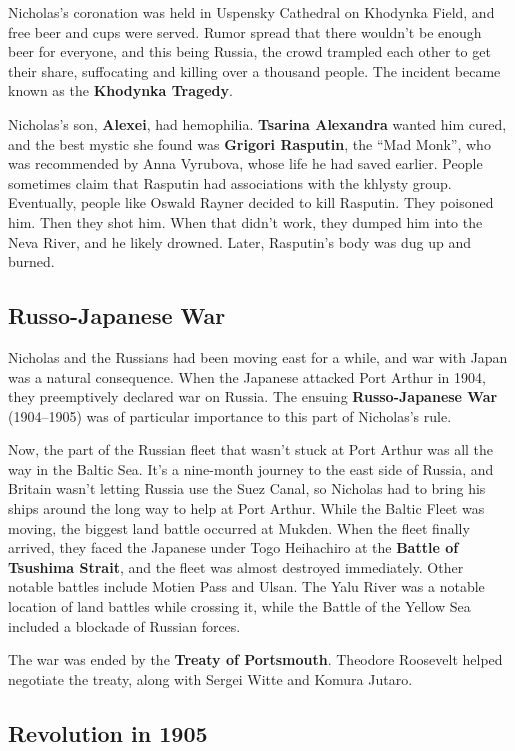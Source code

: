 Nicholas's coronation was held in Uspensky Cathedral on Khodynka Field, and free beer and cups were served.
Rumor spread that there wouldn't be enough beer for everyone, and this being Russia,
the crowd trampled each other to get their share, suffocating and killing over a thousand people.
The incident became known as the \textbf{Khodynka Tragedy}.

Nicholas's son, \textbf{Alexei}, had hemophilia.
\textbf{Tsarina Alexandra} wanted him cured, and the best mystic she found was \textbf{Grigori Rasputin}, the ``Mad Monk'',
who was recommended by Anna Vyrubova, whose life he had saved earlier.
People sometimes claim that Rasputin had associations with the khlysty group.
Eventually, people like Oswald Rayner decided to kill Rasputin.
They poisoned him.
Then they shot him.
When that didn't work, they dumped him into the Neva River, and he likely drowned.
Later, Rasputin's body was dug up and burned.

\subsection*{Russo-Japanese War}

Nicholas and the Russians had been moving east for a while, and war with Japan was a natural consequence.
When the Japanese attacked Port Arthur in 1904, they preemptively declared war on Russia.
The ensuing \textbf{Russo-Japanese War} (1904--1905) was of particular importance to this part of Nicholas's rule.

Now, the part of the Russian fleet that wasn't stuck at Port Arthur was all the way in the Baltic Sea.
It's a nine-month journey to the east side of Russia, and Britain wasn't letting Russia use the Suez Canal,
so Nicholas had to bring his ships around the long way to help at Port Arthur.
While the Baltic Fleet was moving, the biggest land battle occurred at Mukden.
When the fleet finally arrived, they faced the Japanese under Togo Heihachiro at the \textbf{Battle of Tsushima Strait},
and the fleet was almost destroyed immediately.
Other notable battles include Motien Pass and Ulsan.
The Yalu River was a notable location of land battles while crossing it,
while the Battle of the Yellow Sea included a blockade of Russian forces.

The war was ended by the \textbf{Treaty of Portsmouth}.
Theodore Roosevelt helped negotiate the treaty, along with Sergei Witte and Komura Jutaro.

\subsection*{Revolution in 1905}

